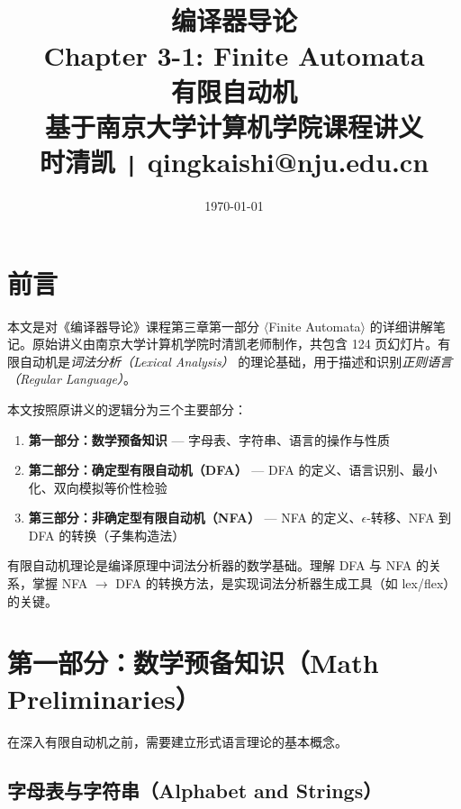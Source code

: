 \documentclass[12pt,a4paper]{ctexart}
\title{
  \vspace{2cm}
  {\Huge\bfseries\color{mainblue} 编译器导论}\\[0.5cm]
  {\Large\color{subblue} Chapter 3-1: Finite Automata}\\[0.3cm]
  {\Large 有限自动机}\\[1cm]
  {\normalsize\color{gray} 基于南京大学计算机学院课程讲义}\\[0.3cm]
  {\normalsize\color{gray} 时清凯 \texttt{|} qingkaishi@nju.edu.cn}
  \vspace{1cm}
}
\author{}
\date{\today}
\begin{document}
\maketitle
\thispagestyle{empty}

\newpage
\setcounter{page}{1}
\tableofcontents
\newpage

\section*{前言}

本文是对《编译器导论》课程第三章第一部分 $\langle$Finite Automata$\rangle$ 的详细讲解笔记。原始讲义由南京大学计算机学院时清凯老师制作，共包含 124 页幻灯片。有限自动机是\emph{词法分析（Lexical Analysis）} 的理论基础，用于描述和识别\emph{正则语言（Regular Language）}。

本文按照原讲义的逻辑分为三个主要部分：

\begin{enumerate}[leftmargin=2em, itemsep=0.3em]
  \item \textbf{第一部分：数学预备知识} — 字母表、字符串、语言的操作与性质
  \item \textbf{第二部分：确定型有限自动机（DFA）} — DFA 的定义、语言识别、最小化、双向模拟等价性检验
  \item \textbf{第三部分：非确定型有限自动机（NFA）} — NFA 的定义、$\epsilon$-转移、NFA 到 DFA 的转换（子集构造法）
\end{enumerate}

\vspace{0.5cm}
有限自动机理论是编译原理中词法分析器的数学基础。理解 DFA 与 NFA 的关系，掌握 NFA $\rightarrow$ DFA 的转换方法，是实现词法分析器生成工具（如 lex/flex）的关键。

\newpage

\section{第一部分：数学预备知识（Math Preliminaries）}

在深入有限自动机之前，需要建立形式语言理论的基本概念。

\subsection{字母表与字符串（Alphabet and Strings）}
\end{document}
